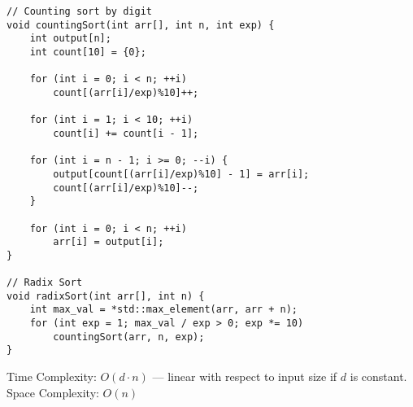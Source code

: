 \documentclass{article}
\begin{document}
\begin{lstlisting}[style=cppstyle]
// Counting sort by digit
void countingSort(int arr[], int n, int exp) {
    int output[n];
    int count[10] = {0};

    for (int i = 0; i < n; ++i)
        count[(arr[i]/exp)%10]++;

    for (int i = 1; i < 10; ++i)
        count[i] += count[i - 1];

    for (int i = n - 1; i >= 0; --i) {
        output[count[(arr[i]/exp)%10] - 1] = arr[i];
        count[(arr[i]/exp)%10]--;
    }

    for (int i = 0; i < n; ++i)
        arr[i] = output[i];
}

// Radix Sort
void radixSort(int arr[], int n) {
    int max_val = *std::max_element(arr, arr + n);
    for (int exp = 1; max_val / exp > 0; exp *= 10)
        countingSort(arr, n, exp);
}
\end{lstlisting}


 Time Complexity: $O(d \cdot n)$ — linear with respect to input size if $d$ is constant. \\
 Space Complexity: $O(n)$ 
\end{document}
